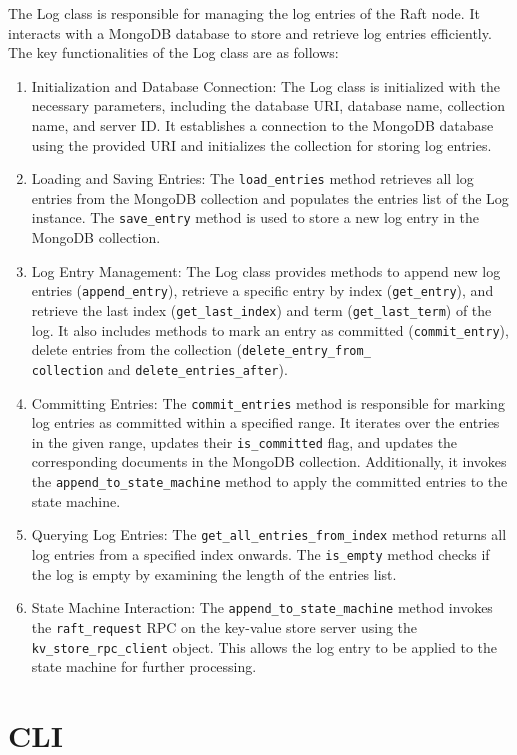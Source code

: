 \documentclass{article}
\begin{document}
The Log class is responsible for managing the log entries of the Raft node. It interacts with 
a MongoDB database to store and retrieve log entries efficiently. The key functionalities of 
the Log class are as follows:
\begin{enumerate}
    \item Initialization and Database Connection: The Log class is initialized with the 
    necessary parameters, including the database URI, database name, collection name, and 
    server ID. It establishes a connection to the MongoDB database using the provided URI and 
    initializes the collection for storing log entries.
    \item Loading and Saving Entries: The \texttt{load\_entries} method retrieves all log 
    entries from the MongoDB collection and populates the entries list of the Log instance. 
    The \texttt{save\_entry} method is used to store a new log entry in the MongoDB 
    collection.
    \item Log Entry Management: The Log class provides methods to append new log entries 
    (\texttt{append\_entry}), retrieve a specific entry by index (\texttt{get\_entry}), and 
    retrieve the last index (\texttt{get\_last\_index}) and term (\texttt{get\_last\_term}) of 
    the log. It also includes methods to mark an entry as committed (\texttt{commit\_entry}), 
    delete entries from the collection (\texttt{delete\_entry\_from\_\\collection} and 
    \texttt{delete\_entries\_after}).
    \item Committing Entries: The \texttt{commit\_entries} method is responsible for marking 
    log entries as committed within a specified range. It iterates over the entries in the 
    given range, updates their \texttt{is\_committed} flag, and updates the corresponding 
    documents in the MongoDB collection. Additionally, it invokes the 
    \texttt{append\_to\_state\_machine} method to apply the committed entries to the state 
    machine.
    \item Querying Log Entries: The \texttt{get\_all\_entries\_from\_index} method returns all 
    log entries from a specified index onwards. The \texttt{is\_empty} method checks if the 
    log is empty by examining the length of the entries list.
    \item State Machine Interaction: The \texttt{append\_to\_state\_machine} method invokes 
    the \texttt{raft\_request} RPC on the key-value store server using the 
    \texttt{kv\_store\_rpc\_client} object. This allows the log entry to be applied to the 
    state machine for further processing.
\end{enumerate}


\section{CLI}


% 
% 
\end{document}
